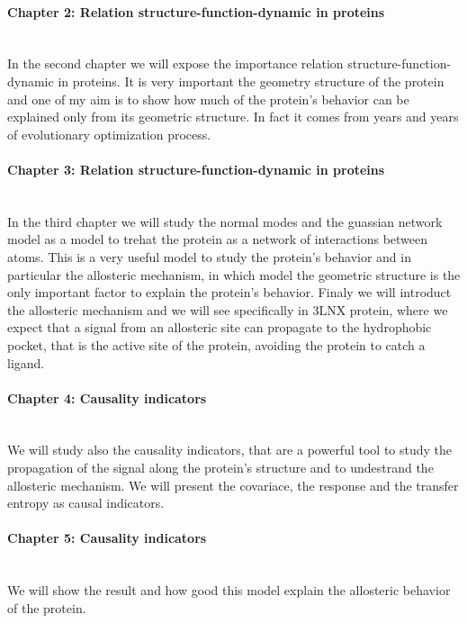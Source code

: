 \documentclass[English, Lau, oneside]{sapthesis}
\begin{document}
\paragraph{Chapter 2: Relation structure-function-dynamic in proteins} \\
In the second chapter we will expose the importance relation structure-function-dynamic in proteins. 
It is very important the geometry structure of the protein and one of my aim is to show how much of the protein's behavior can be explained only from its geometric structure.
In fact it comes from years and years of evolutionary optimization process.

\paragraph{Chapter 3: Relation structure-function-dynamic in proteins} \\
In the third chapter we will study the normal modes and the guassian network model as a model to trehat the protein as a network of interactions between atoms.
This is a very useful model to study the protein's behavior and in particular the allosteric mechanism, in which model the geometric structure is the only important factor to explain the protein's behavior.
Finaly we will introduct the allosteric mechanism and we will see specifically in 3LNX protein, where we expect that a signal from an allosteric site can propagate to the hydrophobic pocket, that is the active site of the protein, avoiding the protein to catch a ligand.\\


\paragraph{Chapter 4: Causality indicators} \\
We will study also the causality indicators, that are a powerful tool to study the propagation of the signal along the protein's structure and to undestrand the allosteric mechanism.
We will present the covariace, the response and the transfer entropy as causal indicators.
\paragraph{Chapter 5: Causality indicators} \\
We will show the result and how good this model explain the allosteric behavior of the protein.

\vspace{1cm}
\end{document}
